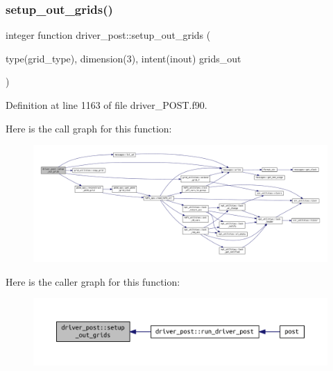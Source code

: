 \subsubsection{\texorpdfstring{setup\+\_\+out\+\_\+grids()}{setup\_out\_grids()}}
{\footnotesize\ttfamily integer function driver\+\_\+post\+::setup\+\_\+out\+\_\+grids (\begin{DoxyParamCaption}\item[{type(grid\+\_\+type), dimension(3), intent(inout)}]{grids\+\_\+out }\end{DoxyParamCaption})}



Definition at line 1163 of file driver\+\_\+\+P\+O\+S\+T.\+f90.

Here is the call graph for this function\+:
\nopagebreak
\begin{figure}[H]
\begin{center}
\leavevmode
\includegraphics[width=350pt]{namespacedriver__post_aba7a645f4dd2e08db109cefc6ce0df86_cgraph}
\end{center}
\end{figure}
Here is the caller graph for this function\+:
\nopagebreak
\begin{figure}[H]
\begin{center}
\leavevmode
\includegraphics[width=350pt]{namespacedriver__post_aba7a645f4dd2e08db109cefc6ce0df86_icgraph}
\end{center}
\end{figure}
\mbox{\label{namespacedriver__post_a71f9fb1935222111e1c7cfc15c5d0269}} 
